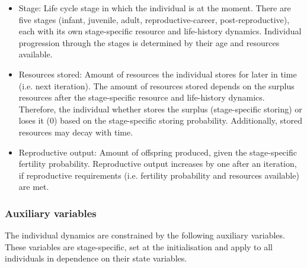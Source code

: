 \documentclass{article}
\begin{document}
\begin{itemize}
\begin{itemize}
        \item Stage: Life cycle stage in which the individual is at the moment. There are five stages (infant, juvenile, adult, reproductive-career, post-reproductive), each with its own stage-specific resource and life-history dynamics. Individual progression through the stages is determined by their age and resources available.
        \item Resources stored: Amount of resources the individual stores for later in time (i.e. next iteration). The amount of resources stored depends on the surplus resources after the stage-specific resource and life-history dynamics. Therefore, the individual whether stores the surplus (stage-specific storing) or loses it (0) based on the stage-specific storing probability. Additionally, stored resources may decay with time.
        \item Reproductive output: Amount of offspring produced, given the stage-specific fertility probability. Reproductive output increases by one after an iteration, if reproductive requirements (i.e. fertility probability and resources available) are met.
    \end{itemize}
\end{itemize}

\subsubsection{Auxiliary variables}

The individual dynamics are constrained by the following auxiliary variables. These variables are stage-specific, set at the initialisation and apply to all individuals in dependence on their state variables.
\end{document}

